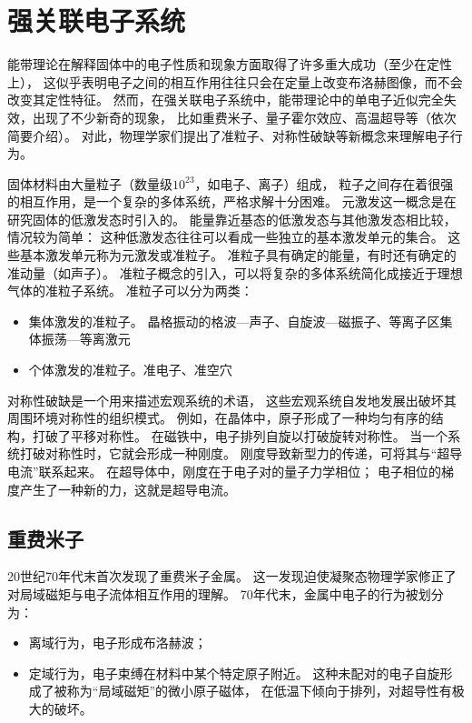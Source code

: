\documentclass{article}
\begin{document}
\section{强关联电子系统}
能带理论在解释固体中的电子性质和现象方面取得了许多重大成功（至少在定性上），
这似乎表明电子之间的相互作用往往只会在定量上改变布洛赫图像，而不会改变其定性特征。
然而，在强关联电子系统中，能带理论中的单电子近似完全失效，出现了不少新奇的现象，
比如重费米子、量子霍尔效应、高温超导等（依次简要介绍）。
对此，物理学家们提出了准粒子、对称性破缺等新概念来理解电子行为。


固体材料由大量粒子（数量级$10^{23}$，如电子、离子）组成，
粒子之间存在着很强的相互作用，是一个复杂的多体系统，严格求解十分困难。
元激发这一概念是在研究固体的低激发态时引入的。
能量靠近基态的低激发态与其他激发态相比较，情况较为简单：
这种低激发态往往可以看成一些独立的基本激发单元的集合。
这些基本激发单元称为元激发或准粒子。
准粒子具有确定的能量，有时还有确定的准动量（如声子）。
准粒子概念的引入，可以将复杂的多体系统简化成接近于理想气体的准粒子系统。
准粒子可以分为两类：
\begin{itemize}
    \item 集体激发的准粒子。
    晶格振动的格波---声子、自旋波---磁振子、等离子区集体振荡---等离激元
    \item 个体激发的准粒子。准电子、准空穴
\end{itemize}


对称性破缺是一个用来描述宏观系统的术语，
这些宏观系统自发地发展出破坏其周围环境对称性的组织模式。
例如，在晶体中，原子形成了一种均匀有序的结构，打破了平移对称性。
在磁铁中，电子排列自旋以打破旋转对称性。
当一个系统打破对称性时，它就会形成一种刚度。
刚度导致新型力的传递，可将其与“超导电流”联系起来。
在超导体中，刚度在于电子对的量子力学相位；
电子相位的梯度产生了一种新的力，这就是超导电流。

\subsection{重费米子}

20世纪70年代末首次发现了重费米子金属。
这一发现迫使凝聚态物理学家修正了对局域磁矩与电子流体相互作用的理解。
70年代末，金属中电子的行为被划分为：
\begin{itemize}
    \item 离域行为，电子形成布洛赫波；
    \item 定域行为，电子束缚在材料中某个特定原子附近。
    这种未配对的电子自旋形成了被称为“局域磁矩”的微小原子磁体，
    在低温下倾向于排列，对超导性有极大的破坏。
\end{itemize}
\end{document}
